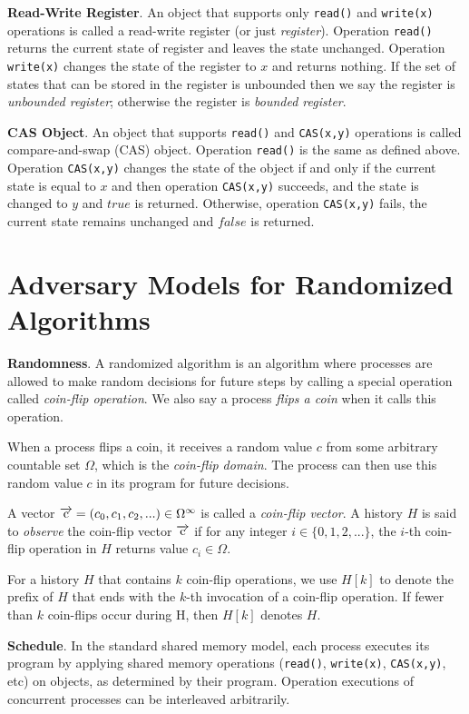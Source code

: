 \textbf{Read-Write Register}.
An object that supports only \texttt{read()} and \texttt{write(x)} operations is called
a read-write register (or just \emph{register}). Operation \texttt{read()} returns the current state of register and
leaves the state unchanged. Operation \texttt{write(x)} changes the state of the register to $x$ and returns nothing.
If the set of states that can be stored in the register is unbounded then we say the register is \emph{unbounded register};
otherwise the register is \emph{bounded register}.

\textbf{CAS Object}. An object that supports \texttt{read()} and \texttt{CAS(x,y)} operations is called compare-and-swap (CAS) object.
Operation \texttt{read()} is the same as defined above. Operation \texttt{CAS(x,y)} changes the state of
the object if and only if the current state is equal to $x$ and then operation \texttt{CAS(x,y)} succeeds, and the state is changed
to $y$ and $true$ is returned. Otherwise, operation \texttt{CAS(x,y)} fails, the current state remains unchanged and
$false$ is returned.

\section{Adversary Models for Randomized Algorithms}

\textbf{Randomness}.
A randomized algorithm is an algorithm where processes are allowed to make random decisions for future steps
by calling a special operation called \emph{coin-flip operation}. We also say a process \emph{flips a coin}
when it calls this operation.

When a process flips a coin, it receives a random value $c$ from some arbitrary countable set $\Omega$,
which is the \emph{coin-flip domain}. The process can then use this random value $c$ in its program for future decisions.

A vector $\overrightarrow{\rm c} = (c_0, c_1, c_2,...) \in \Omega^{\infty}$ is called a \emph{coin-flip vector}.
A history $H$ is said to \emph{observe} the coin-flip vector $\overrightarrow{\rm c}$ if
for any integer $i \in \{0, 1, 2, ...\}$, the $i$-th coin-flip operation in $H$ returns value $c_i \in \Omega$.

For a history $H$ that contains $k$ coin-flip operations, we use $H[k]$ to denote the prefix of $H$
that ends with the $k$-th invocation of a coin-flip operation. If fewer than $k$ coin-flips occur during H, then $H[k]$ denotes $H$.

\textbf{Schedule}.
In the standard shared memory model, each process executes its program by applying
shared memory operations (\texttt{read()}, \texttt{write(x)}, \texttt{CAS(x,y)}, etc) on objects,
as determined by their program. Operation executions of concurrent processes
can be interleaved arbitrarily.

